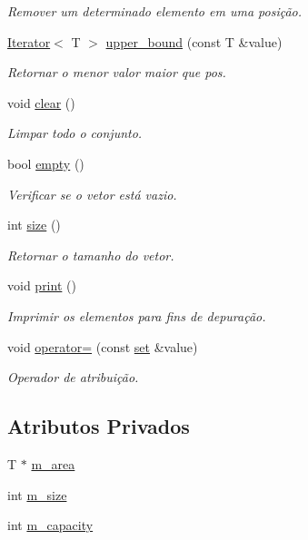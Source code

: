 \begin{DoxyCompactItemize}
\begin{DoxyCompactList}\small\item\em Remover um determinado elemento em uma posição. \end{DoxyCompactList}\item 
\hyperlink{classIterator}{Iterator}$<$ T $>$ \hyperlink{classset_af214bb499a1adca6a48fe8591377ea78}{upper\+\_\+bound} (const T \&value)
\begin{DoxyCompactList}\small\item\em Retornar o menor valor maior que pos. \end{DoxyCompactList}\item 
void \hyperlink{classset_af787aa896950934584af154fc92e4e5a}{clear} ()
\begin{DoxyCompactList}\small\item\em Limpar todo o conjunto. \end{DoxyCompactList}\item 
bool \hyperlink{classset_ac86aef3344daceab852a6740656a41aa}{empty} ()
\begin{DoxyCompactList}\small\item\em Verificar se o vetor está vazio. \end{DoxyCompactList}\item 
int \hyperlink{classset_ac9b2b107eb53dabc41c9c551979b681a}{size} ()
\begin{DoxyCompactList}\small\item\em Retornar o tamanho do vetor. \end{DoxyCompactList}\item 
void \hyperlink{classset_a25a1b1defd5c15a1afe0661b6ac53949}{print} ()
\begin{DoxyCompactList}\small\item\em Imprimir os elementos para fins de depuração. \end{DoxyCompactList}\item 
void \hyperlink{classset_a1a80773dd573dd616df89696adb5e60e}{operator=} (const \hyperlink{classset}{set} \&value)
\begin{DoxyCompactList}\small\item\em Operador de atribuição. \end{DoxyCompactList}\end{DoxyCompactItemize}
\subsection*{Atributos Privados}
\begin{DoxyCompactItemize}
\item 
T $\ast$ \hyperlink{classset_a68aeeb12ca554936bb77a50df1471ab7}{m\+\_\+area}
\item 
int \hyperlink{classset_a812642c970155b2365cee6997e3f7126}{m\+\_\+size}
\item 
int \hyperlink{classset_a2ae225941f817ad23f0e4871c618ce99}{m\+\_\+capacity}
\end{DoxyCompactItemize}


